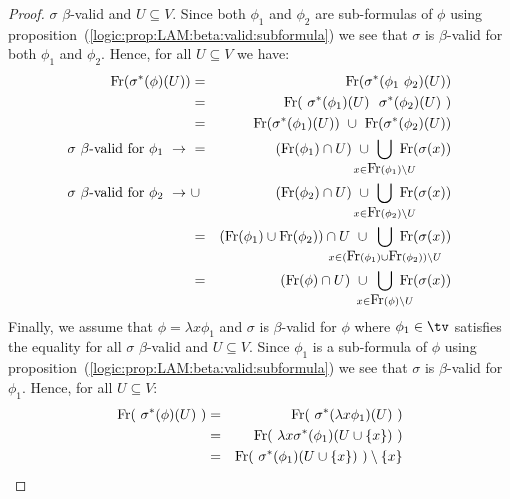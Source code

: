 \begin{proof}
    $\sigma$ $\beta$-valid and $U\subseteq V$. Since both $\phi_{1}$ and 
    $\phi_{2}$ are sub-formulas of $\phi$ using  
    proposition~(\ref{logic:prop:LAM:beta:valid:subformula}) we see that 
    $\sigma$ is $\beta$-valid for both $\phi_{1}$ and $\phi_{2}$. Hence, for 
    all $U\subseteq V$ we have:
    \begin{eqnarray*}
        \free(\sigma^{*}(\phi)(U))
        &=&\free(\sigma^{*}(\phi_{1}\ \phi_{2})(U))\\
        &=&\free(\ \sigma^{*}(\phi_{1})(U)\ \ \sigma^{*}(\phi_{2})(U)\ )\\
        &=&\free(\sigma^{*}(\phi_{1})(U))\ \cup\ \free(\sigma^{*}(\phi_{2})(U))\\
        \mbox{$\sigma$ $\beta$-valid for $\phi_{1}\ \rightarrow\ $}
        &=&(\free(\phi_{1})\cap U)
        \ \cup\ 
        \!\!\!\!\!\!\!\!\!\!
        \bigcup_{x\in\free(\phi_{1})\setminus U} 
        \!\!\!\!\!\!\!\!
        \free(\sigma(x))\\
        \mbox{$\sigma$ $\beta$-valid for $\phi_{2}\ \rightarrow\ $}
        &\cup&(\free(\phi_{2})\cap U)
        \ \cup\ 
        \!\!\!\!\!\!\!\!\!\!
        \bigcup_{x\in\free(\phi_{2})\setminus U} 
        \!\!\!\!\!\!\!\!
        \free(\sigma(x))\\
        &=&(\free(\phi_{1})\cup\free(\phi_{2}))\cap U
        \ \cup\ 
        \!\!\!\!\!\!\!\!\!\!\!\!\!\!\!\!\!\!\!\!
        \bigcup_{x\in(\free(\phi_{1})\cup\free(\phi_{2}))\setminus U}
        \!\!\!\!\!\!\!\!\!\!\!\!\!\!\!\!\!\!\!
        \free(\sigma(x))\\
        &=&(\free(\phi)\cap U)\ \cup\ 
        \!\!\!\!\!\!\!\!
        \bigcup_{x\in\free(\phi)\setminus U}
        \!\!\!\!\!\!\!
        \free(\sigma(x))
    \end{eqnarray*}
    Finally, we assume that $\phi=\lambda x\phi_{1}$ and $\sigma$ is 
    $\beta$-valid for $\phi$ where $\phi_{1}\in\tv$ satisfies the equality 
    for all $\sigma$ $\beta$-valid and $U\subseteq V$. Since $\phi_{1}$ is 
    a sub-formula of $\phi$ using 
    proposition~(\ref{logic:prop:LAM:beta:valid:subformula}) we see that 
    $\sigma$ is $\beta$-valid for $\phi_{1}$. Hence, for all $U\subseteq V$:
    \begin{eqnarray*}
        \free(\ \sigma^{*}(\phi)(U)\ )
        &=&\free(\ \sigma^{*}(\lambda x\phi_{1})(U)\ )\\
        &=&\free(\ \lambda x\sigma^{*}(\phi_{1})(U\cup\{x\})\ )\\
        &=&\free(\ \sigma^{*}(\phi_{1})(U\cup\{x\})\ )\setminus\{x\}\\

\end{eqnarray*}
\end{proof}
